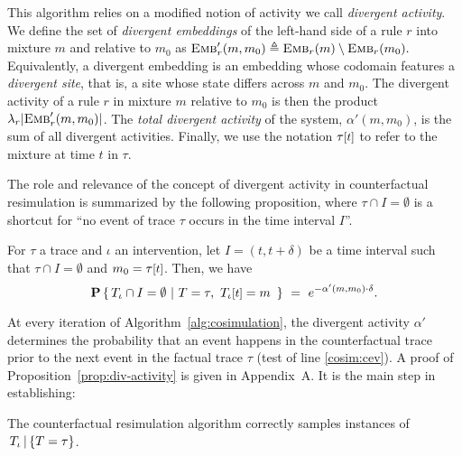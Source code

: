 This algorithm relies on a modified notion of activity we call
\emph{divergent activity}. We define the set of \emph{divergent
  embeddings} of the left-hand side of a rule $r$ into mixture $m$ and
relative to $m_0$ as
${\textsc{Emb}}'_{r}(m, m_0) \triangleq {\textsc{Emb}}_{r}(m) \setminus {\textsc{Emb}}_{r}(m_0).$
Equivalently, a divergent embedding is an embedding whose codomain
features a \emph{divergent site}, that is, a site whose state differs
across $m$ and $m_0$. The {divergent activity} of a rule $r$ in
mixture $m$ relative to $m_0$ is then the product
$\lambda_r|{\textsc{Emb}}'_{r}(m, m_0)|$. The \emph{total divergent activity} of
the system, $\alpha'(m, m_0)$, is the sum of all divergent
activities. Finally, we use the notation $\TSTATE{t}{\tau}$ to refer
to the mixture at time $t$ in $\tau$.



The role and relevance of the concept of divergent activity in
counterfactual resimulation is summarized by the following
proposition, where $\tau \cap I = \emptyset$ is a shortcut for ``no
event of trace $\tau$ occurs in the time interval $I$''.
\begin{proposition}\label{prop:div-activity}
  For $\tau$ a trace and $\iota$ an intervention, let
  $I = (t, t+\delta)$ be a time interval such that
  $\tau \cap I = \emptyset$ and $m_0 = \TSTATE{t}{\tau}$. Then, we
  have
  \[\CProb{ \ATRAJ{} \cap I = \emptyset }{ T=\tau,\
      \TSTATE{t}{\ATRAJ{}} = m\ }
    \ =\ e^{-\alpha'(m, m_0) \cdot \delta}.
  \]
\end{proposition}
\noindent At every iteration of Algorithm~\ref{alg:cosimulation}, the
divergent activity $\alpha'$ determines the probability that an event
happens in the counterfactual trace prior to the next event in the
factual trace $\tau$ (test of line \ref{cosim:cev}).  A proof of
Proposition~\ref{prop:div-activity} is given in
Appendix~A. %
It is the main step in establishing:

\begin{theorem}%
  The counterfactual resimulation algorithm correctly samples
  instances of $\,{T_\iota\,|\,\{T=\tau\}}{}$.
\end{theorem}


